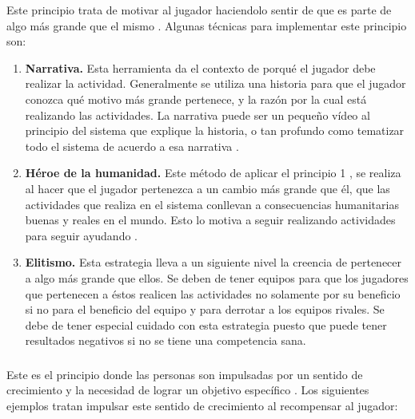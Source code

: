  Este principio trata de motivar al jugador haciendolo sentir de que es parte de algo más grande
 que el mismo \cite[p. 66]{Octalysis}. Algunas técnicas para implementar este principio son:
    
    \begin{enumerate}
    \item
    {\bf Narrativa.}
        Esta herramienta da el contexto de porqué el jugador debe realizar la actividad.
        Generalmente se utiliza una historia para que el jugador conozca qué motivo más
        grande pertenece, y la razón por la cual está realizando las actividades. La
        narrativa puede ser un pequeño vídeo al principio del sistema que explique la
        historia, o tan profundo como tematizar todo el sistema de acuerdo a esa narrativa
        \cite[p. 81]{Octalysis}.
        
    \item
    {\bf Héroe de la humanidad.}
        Este método de aplicar el principio 1 \principioI, se realiza al hacer que el
        jugador pertenezca a un cambio más grande que él, que las actividades que realiza
        en el sistema conllevan a consecuencias humanitarias buenas y reales en el mundo.
        Esto lo motiva a seguir realizando actividades para seguir ayudando \cite[p. 82]{Octalysis}.
        
    \item
    {\bf Elitismo.}
        Esta estrategia lleva a un siguiente nivel la creencia de pertenecer a algo más grande
        que ellos. Se deben de tener equipos para que los jugadores que pertenecen a éstos
        realicen las actividades no solamente por su beneficio si no para el beneficio del
        equipo y para derrotar a los equipos rivales. Se debe de tener especial cuidado con
        esta estrategia puesto que puede tener resultados negativos si no se tiene una
        competencia sana.\cite[p. 83]{Octalysis}
    
    \end{enumerate}
    
\subsubsection{\principioII} \label{subsec:principioII}
    
 Este es el principio donde las personas son impulsadas por un sentido de crecimiento y la
 necesidad de lograr un objetivo específico \cite[p. 91]{Octalysis}. Los siguientes ejemplos
 tratan impulsar este sentido de crecimiento al recompensar al jugador:
    

